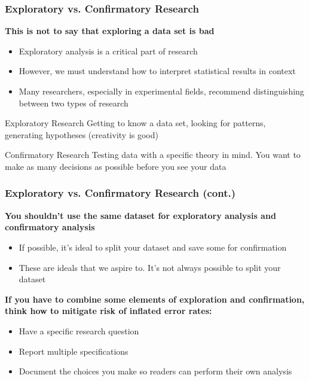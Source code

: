 \documentclass[10pt, block=fill]{beamer}
\begin{document}
\begin{frame}
    \frametitle{Exploratory vs. Confirmatory Research}
    
    \textbf{This is not to say that exploring a data set is bad}
    \begin{itemize}
        \item Exploratory analysis is a critical part of research
        \item However, we must understand how to interpret statistical results in context
        \item Many researchers, especially in experimental fields, recommend distinguishing between two types of research
    \end{itemize}
    
    \begin{block}{Exploratory Research}
        Getting to know a data set, looking for patterns, generating hypotheses (creativity is good)
    \end{block}
    
    \begin{block}{Confirmatory Research}
        Testing data with a specific theory in mind. You want to make as many decisions as possible before you see your data
    \end{block}
    
\end{frame}


\begin{frame}
    \frametitle{Exploratory vs. Confirmatory Research (cont.)}
    
    \textbf{You shouldn't use the same dataset for exploratory analysis and confirmatory analysis}
    \begin{itemize}
        \item If possible, it's ideal to split your dataset and save some for confirmation
        \item These are ideals that we aspire to. It's not always possible to split your dataset
    \end{itemize}
    
    \vspace{0.25in}
    
    \textbf{If you have to combine some elements of exploration and confirmation, think how to mitigate risk of inflated error rates:}
    \begin{itemize}
        \item Have a specific research question
        \item Report multiple specifications
        \item Document the choices you make so readers can perform their own analysis
    \end{itemize}
\end{frame}
\end{document}

